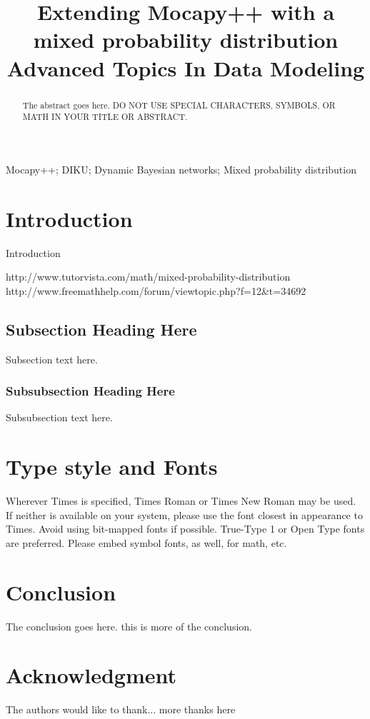 \documentclass[10pt, conference, compsocconf,a4paper]{IEEEtran}
\begin{document}
\title{Extending Mocapy++ with a mixed probability distribution\\Advanced Topics In Data Modeling}


\author{
}

\maketitle


\begin{abstract}
The abstract goes here. DO NOT USE SPECIAL CHARACTERS, SYMBOLS, OR MATH IN YOUR TITLE OR ABSTRACT.

\end{abstract}

\begin{IEEEkeywords}
Mocapy++; DIKU; Dynamic Bayesian networks; Mixed probability distribution

\end{IEEEkeywords}


\section{Introduction}
Introduction

http://www.tutorvista.com/math/mixed-probability-distribution
http://www.freemathhelp.com/forum/viewtopic.php?f=12&t=34692

\subsection{Subsection Heading Here}
Subsection text here.

\subsubsection{Subsubsection Heading Here}
Subsubsection text here.

\section{Type style and Fonts}
Wherever Times is specified, Times Roman or Times New Roman may be used. If neither is available on your system, please use the font closest in appearance to Times. Avoid using bit-mapped fonts if possible. True-Type 1 or Open Type fonts are preferred. Please embed symbol fonts, as well, for math, etc.

\section{Conclusion}
The conclusion goes here. this is more of the conclusion.


\section*{Acknowledgment}

The authors would like to thank...
more thanks here




\end{document}

